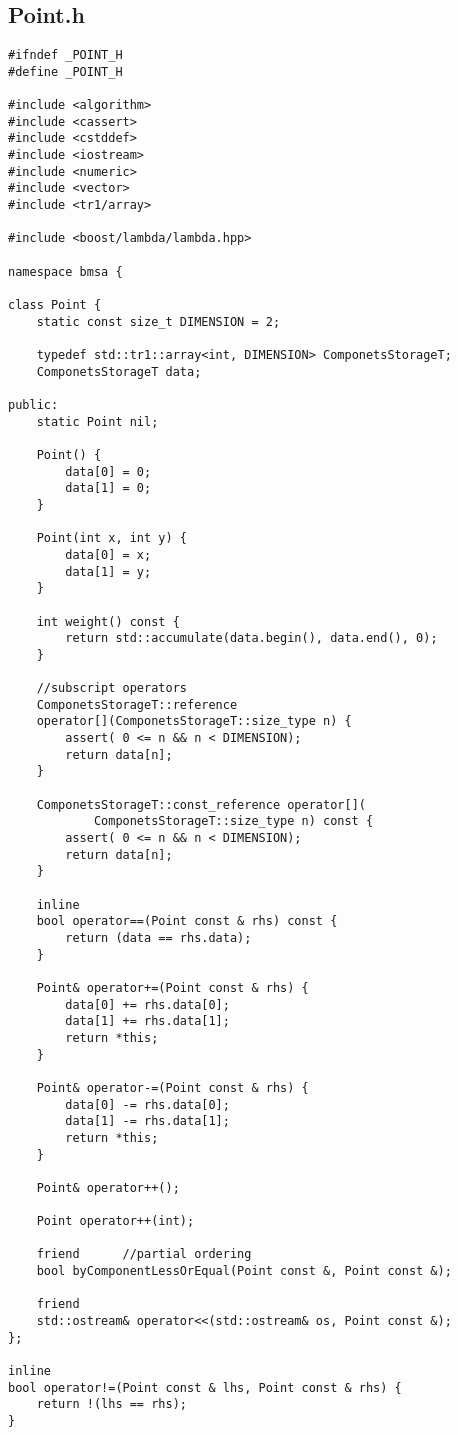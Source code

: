 \subsection*{Point.h}
\begin{lstlisting}
#ifndef _POINT_H
#define	_POINT_H

#include <algorithm>
#include <cassert>
#include <cstddef>
#include <iostream>
#include <numeric>
#include <vector>
#include <tr1/array>

#include <boost/lambda/lambda.hpp>

namespace bmsa {

class Point {
    static const size_t DIMENSION = 2;

    typedef std::tr1::array<int, DIMENSION> ComponetsStorageT;
    ComponetsStorageT data;

public:
    static Point nil;

    Point() {
        data[0] = 0;
        data[1] = 0;
    }

    Point(int x, int y) {
        data[0] = x;
        data[1] = y;
    }

    int weight() const {
        return std::accumulate(data.begin(), data.end(), 0);
    }

    //subscript operators
    ComponetsStorageT::reference 
    operator[](ComponetsStorageT::size_type n) {
        assert( 0 <= n && n < DIMENSION);
        return data[n];
    }

    ComponetsStorageT::const_reference operator[](
            ComponetsStorageT::size_type n) const {
        assert( 0 <= n && n < DIMENSION);
        return data[n];
    }

    inline
    bool operator==(Point const & rhs) const {
        return (data == rhs.data);
    }

    Point& operator+=(Point const & rhs) {
        data[0] += rhs.data[0];
        data[1] += rhs.data[1];
        return *this;
    }

    Point& operator-=(Point const & rhs) {
        data[0] -= rhs.data[0];
        data[1] -= rhs.data[1];
        return *this;
    }

    Point& operator++();

    Point operator++(int);

    friend      //partial ordering
    bool byComponentLessOrEqual(Point const &, Point const &);

    friend
    std::ostream& operator<<(std::ostream& os, Point const &);
};

inline
bool operator!=(Point const & lhs, Point const & rhs) {
    return !(lhs == rhs);
}


\end{lstlisting}

